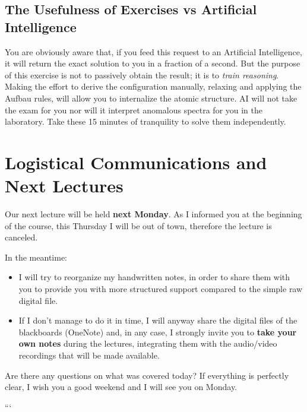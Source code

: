 \subsection{The Usefulness of Exercises vs Artificial Intelligence}

You are obviously aware that, if you feed this request to an Artificial Intelligence, it will return the exact solution to you in a fraction of a second. But the purpose of this exercise is not to passively obtain the result; it is to \textit{train reasoning}. Making the effort to derive the configuration manually, relaxing and applying the Aufbau rules, will allow you to internalize the atomic structure. AI will not take the exam for you nor will it interpret anomalous spectra for you in the laboratory. Take these 15 minutes of tranquility to solve them independently.

\section{Logistical Communications and Next Lectures}

Our next lecture will be held \textbf{next Monday}. As I informed you at the beginning of the course, this Thursday I will be out of town, therefore the lecture is canceled.

In the meantime:
\begin{itemize}
\item I will try to reorganize my handwritten notes, in order to share them with you to provide you with more structured support compared to the simple raw digital file.
\item If I don't manage to do it in time, I will anyway share the digital files of the blackboards (OneNote) and, in any case, I strongly invite you to \textbf{take your own notes} during the lectures, integrating them with the audio/video recordings that will be made available.
\end{itemize}

Are there any questions on what was covered today?
If everything is perfectly clear, I wish you a good weekend and I will see you on Monday.

```
